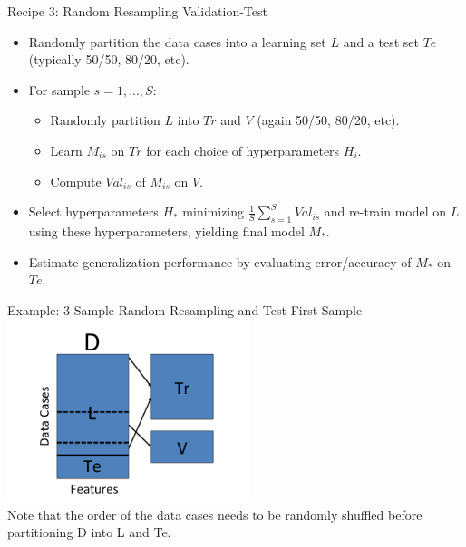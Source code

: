 \documentclass[serif,xcolor=pdftex,dvipsnames,table,hyperref={bookmarks=false}]{beamer}
\begin{document}
\begin{frame}[t]{Recipe 3: Random Resampling Validation-Test}
\begin{itemize}
\setlength{\itemsep}{6pt}

\item Randomly partition the data cases into a learning set $L$ and a test set $Te$ (typically 50/50, 80/20,  etc). 

\pause \item For sample $s=1,...,S$:
\begin{itemize}
  \pause\item Randomly partition $L$ into $Tr$ and $V$ (again 50/50, 80/20, etc).
  \pause\item Learn $M_{is}$ on $Tr$ for each choice of hyperparameters $H_i$.
  \pause\item Compute $Val_{is}$ of $M_{is}$ on $V$.
\end{itemize}
\pause\item Select hyperparameters $H_*$ minimizing $\frac{1}{S}\sum_{s=1}^S Val_{is}$ and re-train model on $L$ using these hyperparameters, yielding final model $M_*$.

\pause\item Estimate generalization performance by evaluating error/accuracy of $M_*$ on $Te$.

\end{itemize}

\end{frame}

\begin{frame}[t]{Example: 3-Sample Random Resampling and Test}
\center
First Sample\\
\includegraphics[width=2.8in]{../Figures/model-selection-rr-te-1.png}\\
Note that the order of the data cases needs to be randomly
shuffled before partitioning D into L and Te. 
\end{frame}
\end{document}
